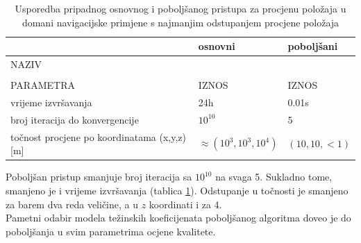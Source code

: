 \documentclass[a4paper,twoside,12pt]{memoir} %
\begin{document}
\begin{table}[H]
	\caption{Usporedba pripadnog osnovnog i poboljšanog pristupa za procjenu položaja u domani navigacijske primjene s najmanjim odstupanjem procjene položaja}
	\begin{center}
		\begin{tabular}{||p{3cm}|p{3.1cm}||p{3.1cm}|}
			\hline
			\cellcolor{lightgray} & osnovni & poboljšani\\
			\hline
			\hline
			\rowcolor{lightgray}NAZIV&   &   \\
			\rowcolor{lightgray}&   &   \\
			\multirow{-3}{0.5cm}{ \cellcolor{lightgray}PARAMETRA} & \multirow{-3}{0.5cm}{\cellcolor{lightgray}IZNOS} & \multirow{-3}{0.5cm}{\cellcolor{lightgray}IZNOS} 
			\\
			\hline
			\vspace{0.1cm}
			vrijeme izvršavanja & \vspace{0.1cm}  24h & \vspace{0.1cm} 0.01s \\
			\vspace{0.1cm}
			broj iteracija do konvergencije &\vspace{0.1cm} $10^10$ &\vspace{0.1cm} 5 \\
			\vspace{0.1cm}
			točnost procjene po koordinatama (x,y,z) [m] & $\approx (10^{3},10^{3},10^{4})$ & $(10,10, < 1)$ \\
			\hline
		\end{tabular}
	\end{center}
	\label{table:usporedba}
\end{table}

Poboljšan pristup smanjuje broj iteracija sa $10^{10}$ na svaga 5. Sukladno tome, smanjeno je i vrijeme izvršavanja (tablica \ref{table:usporedba}).
Odstupanje u točnosti je smanjeno za barem dva reda veličine, a u $z$ koordinati i za 4.\\
Pametni odabir modela težinskih koeficijenata poboljšanog algoritma doveo je do poboljšanja u svim  parametrima ocjene kvalitete.
\end{document}
